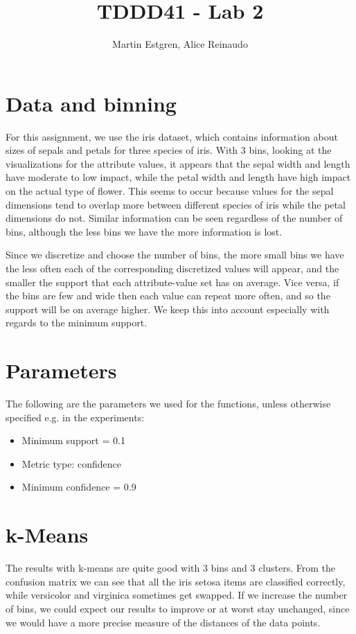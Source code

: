 \documentclass[]{article}
\title{TDDD41 - Lab 2}
\author{Martin Estgren, Alice Reinaudo}
\begin{document}
\maketitle

\section{Data and binning}
For this assignment, we use the iris dataset, which contains information about sizes of sepals and petals for three species of iris. With 3 bins, looking at the visualizations for the attribute values, it appears that the sepal width and length have moderate to low impact, while the petal width and length have high impact on the actual type of flower. This seems to occur because values for the sepal dimensions tend to overlap more between different species of iris while the petal dimensions do not. Similar information can be seen regardless of the number of bins, although the less bins we have the more information is lost.

Since we discretize and choose the number of bins, the more small bins we have the less often each of the corresponding discretized values will appear, and the smaller the support that each attribute-value set has on average. Vice versa, if the bins are few and wide then each value can repeat more often, and so the support will be on average higher. We keep this into account especially with regards to the minimum support.

\section{Parameters}
The following are the parameters we used for the functions, unless otherwise specified e.g. in the experiments:
\begin{itemize}
\item Minimum support = 0.1
\item Metric type: confidence
\item Minimum confidence = 0.9
\end{itemize}

\section{k-Means}
The results with k-means are quite good with 3 bins and 3 clusters. From the confusion matrix we can see that all the iris setosa items are classified correctly, while versicolor and virginica sometimes get swapped. If we increase the number of bins, we could expect our results to improve or at worst stay unchanged, since we would have a more precise measure of the distances of the data points.
\end{document}
